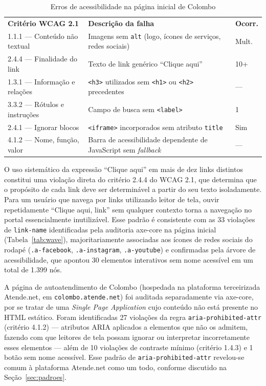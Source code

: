 \documentclass[brazil]{ifpr-pinhais}
\begin{document}
\begin{table}[htb]
\caption{Erros de acessibilidade na página inicial de Colombo}
\label{tab:colombo}
\begin{tabular}{p{3.8cm} p{7cm} p{1.5cm}}
\rowcolor{headerblue}
\color{white}\textbf{Critério WCAG 2.1} & \color{white}\textbf{Descrição da falha} & \color{white}\textbf{Ocorr.} \\
1.1.1 — Conteúdo não textual & Imagens sem \texttt{alt} (logo, ícones de serviços, redes sociais) & Mult. \\
2.4.4 — Finalidade do link   & Texto de link genérico ``Clique aqui'' & 10+ \\
1.3.1 — Informação e relações & \texttt{<h3>} utilizados sem \texttt{<h1>} ou \texttt{<h2>} precedentes & --- \\
3.3.2 — Rótulos e instruções & Campo de busca sem \texttt{<label>} & 1 \\
2.4.1 — Ignorar blocos       & \texttt{<iframe>} incorporados sem atributo \texttt{title} & Sim \\
4.1.2 — Nome, função, valor  & Barra de acessibilidade dependente de JavaScript sem \textit{fallback} & --- \\
\end{tabular}
\end{table}

O uso sistemático da expressão ``Clique aqui'' em mais de dez links distintos constitui uma violação direta do critério 2.4.4 do WCAG 2.1, que determina que o propósito de cada link deve ser determinável a partir do seu texto isoladamente. Para um usuário que navega por links utilizando leitor de tela, ouvir repetidamente ``Clique aqui, link'' sem qualquer contexto torna a navegação no portal essencialmente inutilizável. Esse padrão é consistente com as 33 violações de \texttt{link-name} identificadas pela auditoria axe-core na página inicial (Tabela~\ref{tab:wave}), majoritariamente associadas aos ícones de redes sociais do rodapé (\texttt{.a-facebook}, \texttt{.a-instagram}, \texttt{.a-youtube}) e confirmadas pela árvore de acessibilidade, que apontou 30 elementos interativos sem nome acessível em um total de 1.399 nós.

A página de autoatendimento de Colombo (hospedada na plataforma terceirizada Atende.net, em \texttt{colombo.atende.net}) foi auditada separadamente via axe-core, por se tratar de uma \textit{Single Page Application} cujo conteúdo não está presente no HTML estático. Foram identificadas 27 violações da regra \texttt{aria-prohibited-attr} (critério 4.1.2) --- atributos ARIA aplicados a elementos que não os admitem, fazendo com que leitores de tela possam ignorar ou interpretar incorretamente esses elementos --- além de 10 violações de contraste mínimo (critério 1.4.3) e 1 botão sem nome acessível. Esse padrão de \texttt{aria-prohibited-attr} revelou-se comum à plataforma Atende.net como um todo, conforme discutido na Seção~\ref{sec:padroes}.
\end{document}
